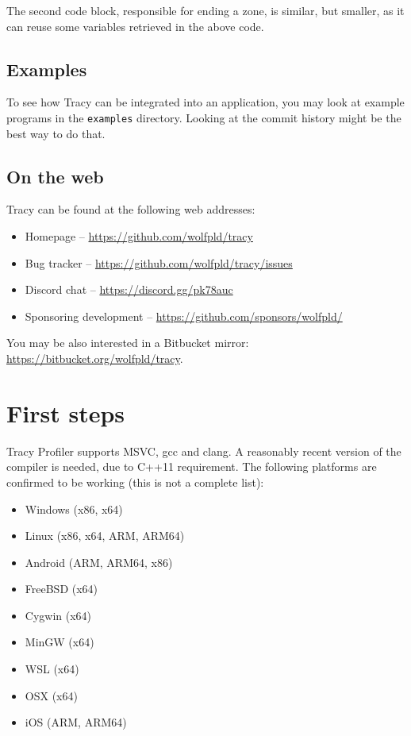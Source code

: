 \documentclass[hidelinks,titlepage,a4paper]{article}
\begin{document}
The second code block, responsible for ending a zone, is similar, but smaller, as it can reuse some variables retrieved in the above code.

\subsection{Examples}

To see how Tracy can be integrated into an application, you may look at example programs in the \texttt{examples} directory. Looking at the commit history might be the best way to do that.

\subsection{On the web}

Tracy can be found at the following web addresses:

\begin{itemize}
\item Homepage -- \url{https://github.com/wolfpld/tracy}
\item Bug tracker -- \url{https://github.com/wolfpld/tracy/issues}
\item Discord chat -- \url{https://discord.gg/pk78auc}
\item Sponsoring development -- \url{https://github.com/sponsors/wolfpld/}
\end{itemize}

You may be also interested in a Bitbucket mirror: \url{https://bitbucket.org/wolfpld/tracy}.

\section{First steps}

Tracy Profiler supports  MSVC, gcc and clang. A reasonably recent version of the compiler is needed, due to C++11 requirement. The following platforms are confirmed to be working (this is not a complete list):

\begin{itemize}
\item Windows (x86, x64)
\item Linux (x86, x64, ARM, ARM64)
\item Android (ARM, ARM64, x86)
\item FreeBSD (x64)
\item Cygwin (x64)
\item MinGW (x64)
\item WSL (x64)
\item OSX (x64)
\item iOS (ARM, ARM64)
\end{itemize}
\end{document}
